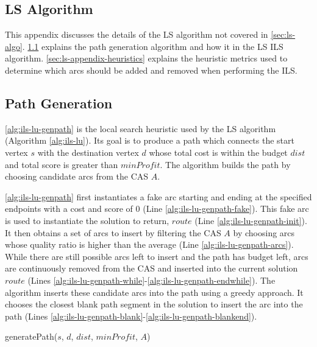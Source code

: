 \documentclass[honors]{union-cs-thesis}
\begin{document}
\begin{appendices}

\section{LS Algorithm}
This appendix discusses the details of the LS algorithm not covered in \cref{sec:ls-algo}. \cref{sec:ls-appendix-path} explains the path generation algorithm and how it in the LS ILS algorithm. \cref{sec:ls-appendix-heuristics} explains the heuristic metrics used to determine which arcs should be added and removed when performing the ILS.
\subsection{Path Generation}
\label{sec:ls-appendix-path}
\cref{alg:ils-lu-genpath} is the local search heuristic used by the LS algorithm (Algorithm \ref{alg:ils-lu}). Its goal is to produce a path which connects the start vertex $s$ with the destination vertex $d$ whose total cost is within the budget $dist$ and total score is greater than $minProfit$. The algorithm builds the path by choosing candidate arcs from the CAS $A$.

\cref{alg:ils-lu-genpath} first instantiates a fake arc starting and ending at the specified endpoints with a cost and score of 0 (Line \ref{alg:ils-lu-genpath-fake}). This fake arc is used to instantiate the solution to return, $route$ (Line \ref{alg:ils-lu-genpath-init}). It then obtains a set of arcs to insert by filtering the CAS $A$ by choosing arcs whose quality ratio is higher than the average (Line \ref{alg:ils-lu-genpath-arcs}). While there are still possible arcs left to insert and the path has budget left, arcs are continuously removed from the CAS and inserted into the current solution $route$ (Lines \ref{alg:ils-lu-genpath-while}-\ref{alg:ils-lu-genpath-endwhile}). The algorithm inserts these candidate arcs into the path using a greedy approach. It chooses the closest blank path segment in the solution to insert the arc into the path (Lines \ref{alg:ils-lu-genpath-blank}-\ref{alg:ils-lu-genpath-blankend}).


%
%
\begin{algorithm}
    \caption{generatePath($s$, $d$, $dist$, $minProfit$, $A$) \label{alg:ils-lu-genpath}}
    

\end{algorithm}
\end{appendices}
\end{document}

